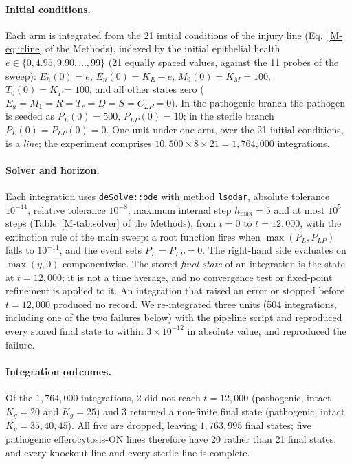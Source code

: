 \documentclass[11pt]{article}
\begin{document}
\paragraph{Initial conditions.} Each arm is integrated from the 21 initial conditions
of the injury line (Eq.~\ref{M-eq:icline} of the Methods), indexed by the initial epithelial health
$e \in \{0, 4.95, 9.90, \dots, 99\}$ (21 equally spaced values, against the 11 probes of
the sweep): $E_h(0) = e$, $E_n(0) = K_E - e$, $M_0(0) = K_M = 100$, $T_0(0) = K_T = 100$,
and all other states zero ($E_a = M_1 = R = T_r = D = S = C_{LP} = 0$). In the pathogenic
branch the pathogen is seeded as $P_L(0) = 500$, $P_{LP}(0) = 10$; in the sterile
branch $P_L(0) = P_{LP}(0) = 0$. One unit under one arm, over the 21 initial
conditions, is a \emph{line}; the experiment comprises
$10{,}500 \times 8 \times 21 = 1{,}764{,}000$ integrations.

\paragraph{Solver and horizon.} Each integration uses \texttt{deSolve::ode} with method
\texttt{lsodar}, absolute tolerance $10^{-14}$, relative
tolerance $10^{-8}$, maximum internal step $h_{\max} = 5$ and at most $10^5$ steps
(Table~\ref{M-tab:solver} of the Methods),
from $t = 0$ to $t = 12{,}000$, with the extinction rule of the main sweep: a root
function fires when $\max(P_L, P_{LP})$ falls to $10^{-11}$, and the event sets
$P_L = P_{LP} = 0$. The right-hand side evaluates on $\max(y, 0)$ componentwise. The
stored \emph{final state} of an integration is the state at $t = 12{,}000$; it is not a
time average, and no convergence test or fixed-point refinement is applied to it.
An integration that raised an error or stopped before $t = 12{,}000$ produced no
record. We re-integrated three units (504 integrations, including one of the two
failures below) with the pipeline script and reproduced every stored final state to
within $3\times10^{-12}$ in absolute value, and reproduced the failure.

\paragraph{Integration outcomes.} Of the $1{,}764{,}000$ integrations, 2 did not reach
$t = 12{,}000$ (pathogenic, intact $K_g = 20$ and $K_g = 25$) and 3 returned a
non-finite final state (pathogenic, intact $K_g = 35, 40, 45$). All five are dropped,
leaving $1{,}763{,}995$ final states; five pathogenic efferocytosis-ON lines therefore have 20
rather than 21 final states, and every knockout line and every sterile line is
complete.
\end{document}
